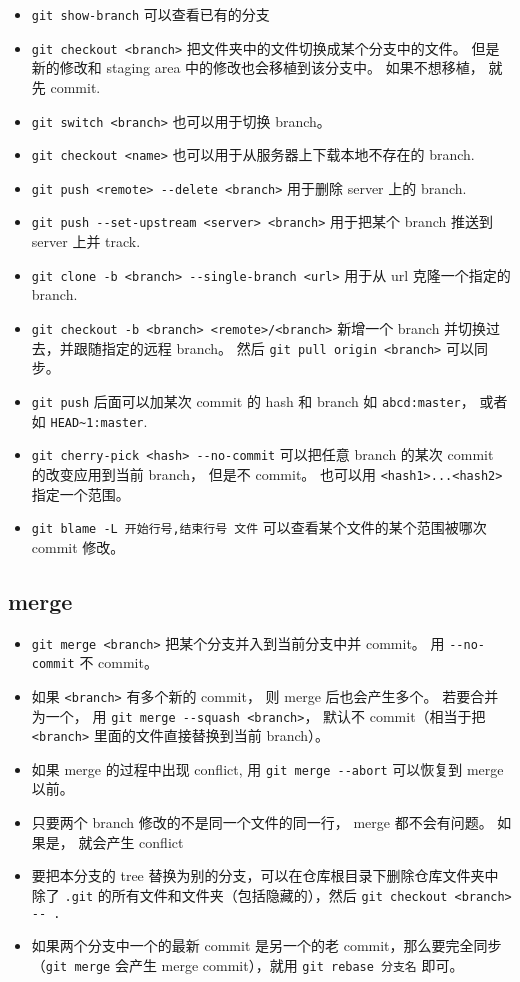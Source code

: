 \begin{itemize}
\item \verb`git show-branch` 可以查看已有的分支 
\item \verb`git checkout <branch>` 把文件夹中的文件切换成某个分支中的文件。 但是新的修改和 staging area 中的修改也会移植到该分支中。 如果不想移植， 就先 commit.
\item \verb`git switch <branch>` 也可以用于切换 branch。
\item \verb`git checkout <name>` 也可以用于从服务器上下载本地不存在的 branch.
\item \verb`git push <remote> --delete <branch>` 用于删除 server 上的 branch.
\item \verb`git push --set-upstream <server> <branch>` 用于把某个 branch 推送到 server 上并 track.
\item \verb`git clone -b <branch> --single-branch <url>` 用于从 url 克隆一个指定的 branch.
\item \verb`git checkout -b <branch> <remote>/<branch>` 新增一个 branch 并切换过去，并跟随指定的远程 branch。 然后 \verb`git pull origin <branch>` 可以同步。
\item \verb`git push` 后面可以加某次 commit 的 hash 和 branch 如 \verb`abcd:master`， 或者如 \verb`HEAD~1:master`.
\item \verb`git cherry-pick <hash> --no-commit` 可以把任意 branch 的某次 commit 的改变应用到当前 branch， 但是不 commit。 也可以用 \verb`<hash1>...<hash2>` 指定一个范围。
\item \verb`git blame -L 开始行号,结束行号 文件`  可以查看某个文件的某个范围被哪次 commit 修改。
\end{itemize}

\subsection{merge}
\begin{itemize}
\item \verb`git merge <branch>` 把某个分支并入到当前分支中并 commit。 用 \verb`--no-commit` 不 commit。
\item 如果 \verb`<branch>` 有多个新的 commit， 则 merge 后也会产生多个。 若要合并为一个， 用 \verb`git merge --squash <branch>`， 默认不 commit（相当于把 \verb`<branch>` 里面的文件直接替换到当前 branch）。
\item 如果 merge 的过程中出现 conflict, 用 \verb`git merge --abort` 可以恢复到 merge 以前。
\item 只要两个 branch 修改的不是同一个文件的同一行， merge 都不会有问题。 如果是， 就会产生 conflict
\item 要把本分支的 tree 替换为别的分支，可以在仓库根目录下删除仓库文件夹中除了 \verb`.git` 的所有文件和文件夹（包括隐藏的），然后 \verb`git checkout <branch> -- .`
\item 如果两个分支中一个的最新 commit 是另一个的老 commit，那么要完全同步（\verb`git merge` 会产生 merge commit），就用 \verb`git rebase 分支名` 即可。
\end{itemize}



